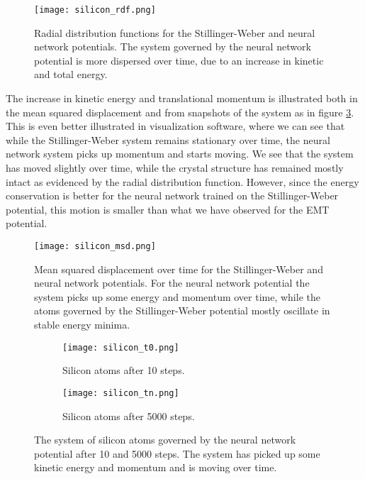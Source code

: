 \begin{figure}[H]
    \centering
    \texttt{[image: silicon\_rdf.png]}
    \caption{Radial distribution functions for the Stillinger-Weber and
        neural network potentials.
        The system governed by the neural network potential is more dispersed
        over time, due to an increase in kinetic and total energy.}
    \label{fig:silicon-rdf}
\end{figure}

The increase in kinetic energy and translational momentum is illustrated
both in the mean squared displacement and from snapshots of the system
as in figure \ref{fig:silicon-time}. This is even better illustrated
in visualization software, where we can see that while the
Stillinger-Weber system remains stationary over time, the neural network
system picks up momentum and starts moving.
We see that the system has moved slightly over time, while the crystal
structure has remained mostly intact as evidenced by the radial distribution
function.
However, since the energy conservation is better for the neural network
trained on the Stillinger-Weber potential, this motion is smaller
than what we have observed for the EMT potential.

\begin{figure}[H]
    \centering
    \texttt{[image: silicon\_msd.png]}
    \caption{Mean squared displacement over time for the Stillinger-Weber
        and neural network potentials.
        For the neural network potential the system picks up some energy
        and momentum over time, while the atoms governed by the Stillinger-Weber
        potential mostly oscillate in stable energy minima.}
    \label{fig:silicon-msd}
\end{figure}

\begin{figure}[H]
\begin{adjustbox}{max width=1.2\linewidth,center}
\centering
  \begin{subfigure}[b]{0.55\textwidth}
      \texttt{[image: silicon\_t0.png]}
      \caption{Silicon atoms after 10 steps.}
  \end{subfigure}
  \hfill
  \begin{subfigure}[b]{0.55\textwidth}
      \texttt{[image: silicon\_tn.png]}
      \caption{Silicon atoms after 5000 steps.}
  \end{subfigure}
\end{adjustbox}
    \caption{The system of silicon atoms governed by the neural
    network potential after 10 and 5000 steps.
    The system has picked up some kinetic energy and momentum and is moving
    over time.}
    \label{fig:silicon-time}
\end{figure}

